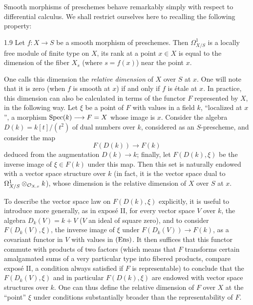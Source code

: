 Smooth morphisms of preschemes behave remarkably simply with respect to differential calculus. We shall restrict ourselves here to recalling the following property:
\begin{proposition}{1.9}\label{XI.1.9}
Let $f:X\to S$ be a smooth morphism of preschemes. Then $\Omega^1_{X/S}$ is a locally free module of finite type on $X$, its rank at a point $x\in X$ is equal to the dimension of the fiber $X_s$ (where $s=f(x)$) near the point $x$.
\end{proposition}
One calls this dimension the \emph{relative dimension} of $X$ over $S$ at $x$. One will note that it is zero (when $f$ is smooth at $x$) if and only if $f$ is étale at $x$. In practice, this dimension can also be calculated in terms of the functor $F$ represented by $X$, in the following way. Let $\xi$ be a point of $F$ with values in a field $k$, ``localized at $x$'', \ie a morphism $\operatorname{Spec}(k)\longrightarrow F=X$ whose image is $x$. Consider the algebra $D(k)=k[t]/(t^2)$ of dual numbers over $k$, considered as an $S$-prescheme, and consider the map
\[
F(D(k))\to F(k)
\]
deduced from the augmentation $D(k)\to k$; finally, let $F(D(k),\xi)$ be the inverse image of $\xi\in F(k)$ under this map. Then this set is naturally endowed with a vector space structure over $k$ (in fact, it is the vector space dual to $\Omega^1_{X/S}\otimes_{\mathcal{O}_{X,x}}k$), whose dimension is the relative dimension of $X$ over $S$ at $x$.

To describe the vector space law on $F(D(k),\xi)$ explicitly, it is useful to introduce more generally, as in exposé II, for every vector space $V$ over $k$, the algebra $D_k(V)=k+V$ ($V$ an ideal of square zero), and to consider $F(D_k(V),\xi)$, the inverse image of $\xi$ under $F(D_k(V))\to F(k)$, as a covariant functor in $V$ with values in $\textup{(Ens)}$. It then suffices that this functor commute with products of two factors (which means that $F$ transforms certain amalgamated sums of a very particular type into fibered products, compare exposé II, a condition always satisfied if $F$ is representable) to conclude that the $F(D_k(V),\xi)$ and in particular $F(D(k),\xi)$ are endowed with vector space structures over $k$. One can thus define the relative dimension of $F$ over $X$ at the ``point'' $\xi$ under conditions substantially broader than the representability of $F$.

